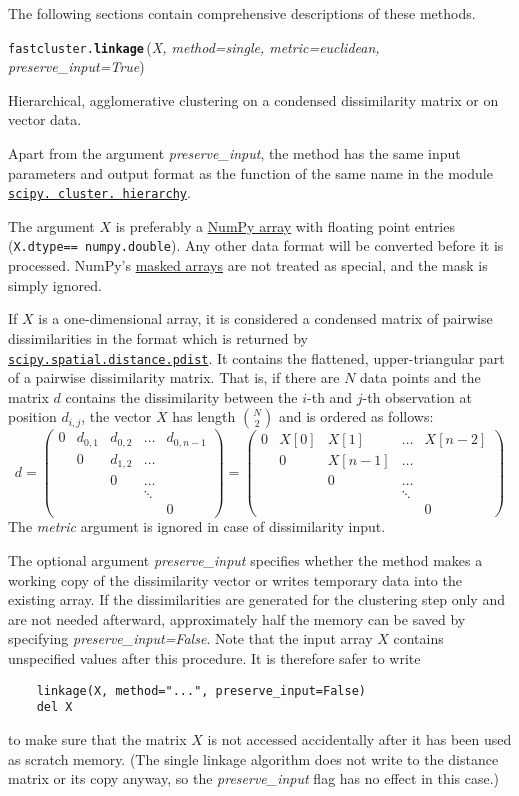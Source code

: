 \documentclass[fontsize=10pt,paper=letter,BCOR=-6mm,DIV=8]{scrartcl}
\makeatletter
\newcommand*\q{\textquotesingle}
\newcommand*\hierarchy{\href{https://docs.scipy.org/doc/scipy/reference/generated/scipy.cluster.hierarchy.linkage.html}{\texttt{scipy.\hskip0pt cluster.\hskip0pt hierarchy}}}
\newcommand*\NumPyarray{\href{https://docs.scipy.org/doc/numpy/reference/generated/numpy.ndarray.html}{NumPy array}}
\newcommand*\maskedarrays{\href{https://docs.scipy.org/doc/numpy/reference/maskedarray.html}{masked arrays}}
\newcommand*\pdist{\href{https://docs.scipy.org/doc/scipy/reference/generated/scipy.spatial.distance.pdist.html}{\texttt{scipy.spatial.distance.pdist}}}
\newenvironment{methods}{%
  \list{}{\labelwidth\z@
    \itemindent-\leftmargin
    \let\makelabel\methodslabel}%
}{%
  \endlist
}
\newcommand*{\methodslabel}[1]{%
  \hbox to \textwidth{\hspace{\labelsep}%
  \normalfont\bfseries\ttfamily
  #1\hskip-\labelsep\hfill}%
}
\makeatother
\begin{document}
The following sections contain comprehensive descriptions of these methods.

\begin{methods}
\item [\normalfont\texttt{fastcluster.\textbf{linkage}}\,(\textit{X, method=\q single\q, metric=\q euclidean\q, preserve\_input=\q True\q})]
\label{linkage}

Hierarchical, agglomerative clustering on a condensed dissimilarity matrix or on vector data.

Apart from the argument \textit{preserve\_input}, the method has the same input parameters and output format as the function of the same name in the module \hierarchy.

The argument $X$ is preferably a \NumPyarray{} with floating point entries (\texttt{X.dtype\hskip0pt==\hskip0pt numpy.double}). Any other data format will be converted before it is processed. NumPy's \maskedarrays{} are not treated as special, and the mask is simply ignored.

If $X$ is a one-dimensional array, it is considered a condensed matrix of pairwise dissimilarities in the format which is returned by \pdist. It contains the flattened, upper-triangular part of a pairwise dissimilarity matrix. That is, if there are $N$ data points and the matrix $d$ contains the dissimilarity between the $i$-th and $j$-th observation at position $d_{i,j}$, the vector $X$ has length $\binom N2$ and is ordered as follows:
\[
d
= \begin{pmatrix}
0&d_{0,1}&d_{0,2}&\ldots&d_{0,n-1}\\
 & 0&d_{1,2} & \ldots\\
&&0&\ldots\\
&&&\ddots\\
&&&&0
 \end{pmatrix}
= \begin{pmatrix}
0&X[0] &X[1]&\ldots&X[n-2]\\
 & 0&X[n-1] & \ldots\\
&&0&\ldots\\
&&&\ddots\\
&&&&0
 \end{pmatrix}
\]
The \textit{metric} argument is ignored in case of dissimilarity input.

The optional argument \textit{preserve\_input} specifies whether the method makes a working copy of the dissimilarity vector or writes temporary data into the existing array. If the dissimilarities are generated for the clustering step only and are not needed afterward, approximately half the memory can be saved by specifying \textit{preserve\_input=False}. Note that the input array $X$ contains unspecified values after this procedure. It is therefore safer to write
\begin{verbatim}
    linkage(X, method="...", preserve_input=False)
    del X
\end{verbatim}
to make sure that the matrix $X$ is not accessed accidentally  after it has been
used as scratch memory. (The single linkage algorithm does not write to the distance matrix or its copy anyway, so the \textit{preserve\_input} flag has no effect in this case.)


\end{methods}
\end{document}
